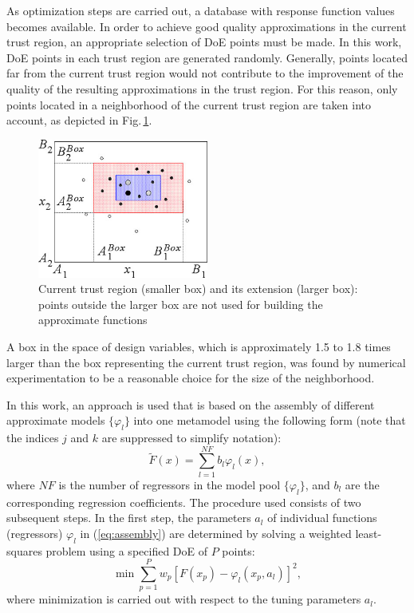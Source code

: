 \documentclass[runningheads,a4paper]{llncs}
\begin{document}
As optimization steps are carried out, a database with response function values
becomes available. In order to achieve good quality approximations in the
current trust region, an appropriate selection of DoE points must be made. In
this work, DoE points in each trust region are generated randomly. Generally,
points located far from the current trust region would not contribute to the
improvement of the quality of the resulting approximations in the trust region.
For this reason, only points located in a neighborhood of the current trust
region are taken into account, as depicted in Fig.\,\ref{fig:trustregion}.
\begin{figure}[ht]
    \centering
    \includegraphics[width=0.5\textwidth]{trustregion.png}
    \caption{Current trust region (smaller box) and its extension (larger box):
    points outside the larger box are not used for building the approximate
    functions}
    \label{fig:trustregion}
\end{figure}
A box in the space of design variables, which is approximately 1.5 to 1.8 times
larger than the box representing the current trust region, was found by
numerical experimentation to be a reasonable choice for the size of the
neighborhood.

In this work, an approach is used that is based on the assembly of different
approximate models $\{\varphi_l\}$ into one metamodel using the following form
(note that the indices $j$ and $k$ are suppressed to simplify notation):
\begin{equation}\label{eq:assembly}
\widetilde{F}(x) = \sum_{l=1}^{NF}{b_l\varphi_l(x)},
\end{equation}
where $NF$ is the number of regressors in the model pool $\{\varphi_l\}$, and
$b_l$ are the corresponding regression coefficients. The  procedure used
consists of two subsequent steps. In the first step, the parameters $a_l$ of
individual functions (regressors) $\varphi_l$ in (\ref{eq:assembly}) are
determined by solving a weighted least-squares problem using a specified DoE of
$P$ points:
\[
\min \sum_{p=1}^P{w_{p}\left[ F(x_p)- \varphi_l(x_p,a_l) \right]^2},
\]
where minimization is carried out with respect to the tuning parameters $a_l$.
\end{document}
